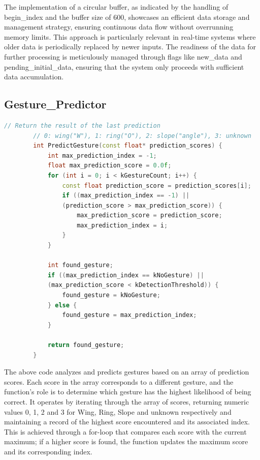 	The implementation of a circular buffer, as indicated by the handling of begin\_index and the buffer size of 600, showcases an efficient data storage and management strategy, ensuring continuous data flow without overrunning memory limits. This approach is particularly relevant in real-time systems where older data is periodically replaced by newer inputs. The readiness of the data for further processing is meticulously managed through flags like new\_data and pending\_initial\_data, ensuring that the system only proceeds with sufficient data accumulation. 
	
	\subsection{Gesture\_Predictor}
	\begin{lstlisting}[language=C++, caption={Gesture Prediction Based on Model Output Scores}, label={code:gesture-prediction}, style=bashstyle]
		// Return the result of the last prediction
		// 0: wing("W"), 1: ring("O"), 2: slope("angle"), 3: unknown
		int PredictGesture(const float* prediction_scores) {
			int max_prediction_index = -1;
			float max_prediction_score = 0.0f;
			for (int i = 0; i < kGestureCount; i++) {
				const float prediction_score = prediction_scores[i];
				if ((max_prediction_index == -1) ||
				(prediction_score > max_prediction_score)) {
					max_prediction_score = prediction_score;
					max_prediction_index = i;
				}
			}
			
			int found_gesture;
			if ((max_prediction_index == kNoGesture) ||
			(max_prediction_score < kDetectionThreshold)) {
				found_gesture = kNoGesture;
			} else {
				found_gesture = max_prediction_index;
			}
			
			return found_gesture;
		}
	\end{lstlisting}
	
	
	The above code analyzes and predicts gestures based on an array of prediction scores. Each score in the array corresponds to a different gesture, and the function's role is to determine which gesture has the highest likelihood of being correct. It operates by iterating through the array of scores, returning numeric values 0, 1, 2 and
	3 for Wing, Ring, Slope and unknown respectively and maintaining a record of the highest score encountered and its associated index. This is achieved through a for-loop that compares each score with the current maximum; if a higher score is found, the function updates the maximum score and its corresponding index. 
	
